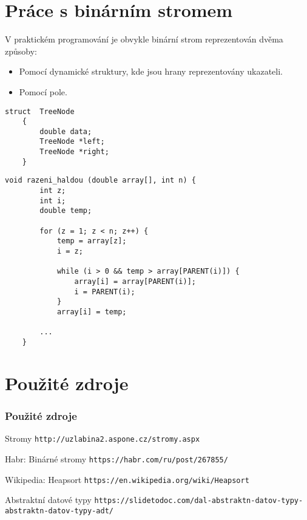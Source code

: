 \documentclass[10pt, hyperref={unicode}, xcolor=dvipsnames]{beamer}
\begin{document}
\section{Práce s binárním stromem}


\begin{frame}
    V praktickém programování je obvykle binární strom reprezentován dvěma způsoby: 
    
    \begin{itemize}
        \item<1-> Pomocí \alert{dynamické struktury}, kde jsou hrany reprezentovány ukazateli.
        \item<2-> Pomocí \alert{pole}.
    \end{itemize}
    
\end{frame}

\begin{frame}[fragile]
    
    \begin{lstlisting}[title={Příklad struktury:}]
    struct  TreeNode
    {
        double data; 
        TreeNode *left;  
        TreeNode *right;
    }
    \end{lstlisting}
\end{frame}




\begin{frame}[fragile]
    
    \begin{lstlisting}[title={Příklad algoritmu s poli (Řazení haldou):}]
    void razeni_haldou (double array[], int n) {
        int z; 
        int i;
        double temp;
    
        for (z = 1; z < n; z++) {
            temp = array[z];
            i = z;
        
            while (i > 0 && temp > array[PARENT(i)]) {
                array[i] = array[PARENT(i)];
                i = PARENT(i);
            }
            array[i] = temp;
        
        ...
    }
    \end{lstlisting}
\end{frame}



\section{Použité zdroje}

\begin{frame}
\frametitle{Použité zdroje}
\begin{thebibliography}{10}
		 Stromy
		\newblock \texttt{http://uzlabina2.aspone.cz/stromy.aspx}

		 Habr: Binárné stromy
		\newblock \texttt{https://habr.com/ru/post/267855/}
		
		 Wikipedia: Heapsort
		\newblock \texttt{https://en.wikipedia.org/wiki/Heapsort}
		
		 Abstraktní datové typy
		\newblock \texttt{https://slidetodoc.com/dal-abstraktn-datov-typy-abstraktn-datov-typy-adt/}
	\end{thebibliography}
\end{frame}
\end{document}
